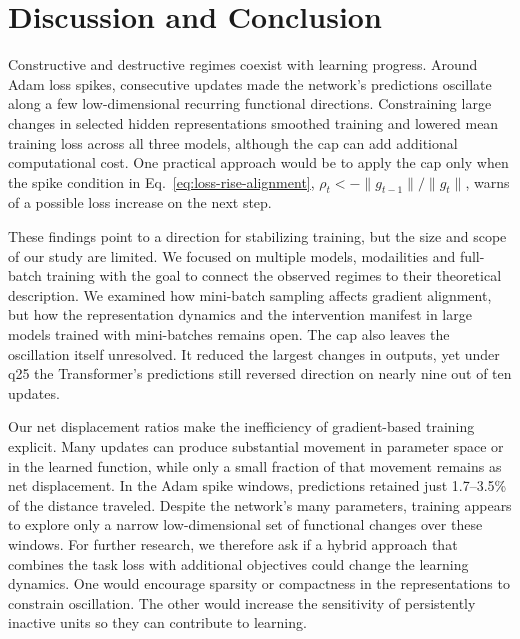 \section{Discussion and Conclusion}
\label{sec:conclusion}

Constructive and destructive regimes coexist with learning progress. Around Adam loss spikes, consecutive updates made the network's predictions oscillate along a few low-dimensional recurring functional directions. Constraining large changes in selected hidden representations smoothed training and lowered mean training loss across all three models, although the cap can add additional computational cost. One practical approach would be to apply the cap only when the spike condition in Eq.~\eqref{eq:loss-rise-alignment}, $\rho_t<-\|g_{t-1}\|/\|g_t\|$, warns of a possible loss increase on the next step.

These findings point to a direction for stabilizing training, but the size and scope of our study are limited. We focused on multiple models, modailities and full-batch training with the goal to connect the observed regimes to their theoretical description. We examined how mini-batch sampling affects gradient alignment, but how the representation dynamics and the intervention manifest in large models trained with mini-batches remains open. The cap also leaves the oscillation itself unresolved. It reduced the largest changes in outputs, yet under q25 the Transformer's predictions still reversed direction on nearly nine out of ten updates.

Our net displacement ratios make the inefficiency of gradient-based training explicit. Many updates can produce substantial movement in parameter space or in the learned function, while only a small fraction of that movement remains as net displacement. In the Adam spike windows, predictions retained just 1.7--3.5\% of the distance traveled. Despite the network's many parameters, training appears to explore only a narrow low-dimensional set of functional changes over these windows. For further research, we therefore ask if a hybrid approach that combines the task loss with additional objectives could change the learning dynamics. One would encourage sparsity or compactness in the representations to constrain oscillation. The other would increase the sensitivity of persistently inactive units so they can contribute to learning.
